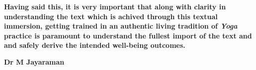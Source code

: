 \textbf{Having said this, it is very important that along with clarity in understanding the text which is achived through this textual immersion, getting trained in an authentic living tradition of \textit{Yoga} practice is paramount to understand the fullest import of the text and and safely derive the intended well-being outcomes.}
\vspace{1cm}

\begin{flushright}
\textbf{Dr M Jayaraman}
\end{flushright}
